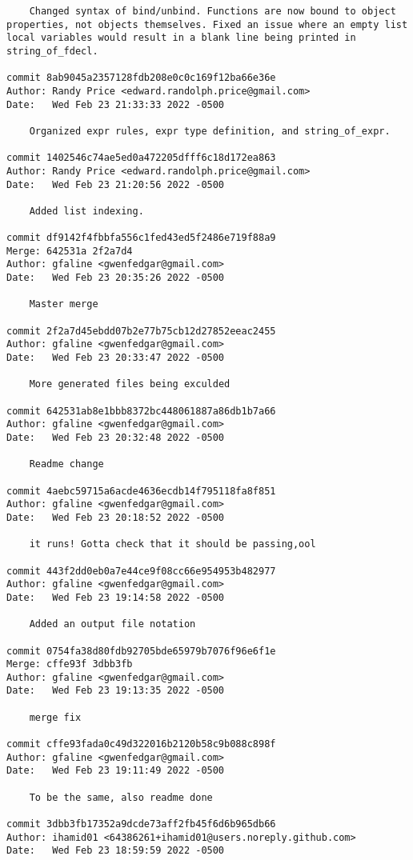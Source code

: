 {\begin{verbatim}
    Changed syntax of bind/unbind. Functions are now bound to object properties, not objects themselves. Fixed an issue where an empty list local variables would result in a blank line being printed in string_of_fdecl.

commit 8ab9045a2357128fdb208e0c0c169f12ba66e36e
Author: Randy Price <edward.randolph.price@gmail.com>
Date:   Wed Feb 23 21:33:33 2022 -0500

    Organized expr rules, expr type definition, and string_of_expr.

commit 1402546c74ae5ed0a472205dfff6c18d172ea863
Author: Randy Price <edward.randolph.price@gmail.com>
Date:   Wed Feb 23 21:20:56 2022 -0500

    Added list indexing.

commit df9142f4fbbfa556c1fed43ed5f2486e719f88a9
Merge: 642531a 2f2a7d4
Author: gfaline <gwenfedgar@gmail.com>
Date:   Wed Feb 23 20:35:26 2022 -0500

    Master merge

commit 2f2a7d45ebdd07b2e77b75cb12d27852eeac2455
Author: gfaline <gwenfedgar@gmail.com>
Date:   Wed Feb 23 20:33:47 2022 -0500

    More generated files being exculded

commit 642531ab8e1bbb8372bc448061887a86db1b7a66
Author: gfaline <gwenfedgar@gmail.com>
Date:   Wed Feb 23 20:32:48 2022 -0500

    Readme change

commit 4aebc59715a6acde4636ecdb14f795118fa8f851
Author: gfaline <gwenfedgar@gmail.com>
Date:   Wed Feb 23 20:18:52 2022 -0500

    it runs! Gotta check that it should be passing,ool

commit 443f2dd0eb0a7e44ce9f08cc66e954953b482977
Author: gfaline <gwenfedgar@gmail.com>
Date:   Wed Feb 23 19:14:58 2022 -0500

    Added an output file notation

commit 0754fa38d80fdb92705bde65979b7076f96e6f1e
Merge: cffe93f 3dbb3fb
Author: gfaline <gwenfedgar@gmail.com>
Date:   Wed Feb 23 19:13:35 2022 -0500

    merge fix

commit cffe93fada0c49d322016b2120b58c9b088c898f
Author: gfaline <gwenfedgar@gmail.com>
Date:   Wed Feb 23 19:11:49 2022 -0500

    To be the same, also readme done

commit 3dbb3fb17352a9dcde73aff2fb45f6d6b965db66
Author: ihamid01 <64386261+ihamid01@users.noreply.github.com>
Date:   Wed Feb 23 18:59:59 2022 -0500


\end{verbatim}}

